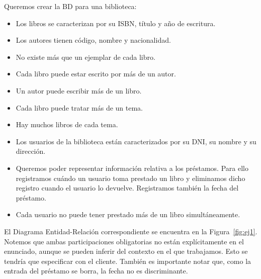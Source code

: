 \begin{ejercicio} \label{ej:1}
    Queremos crear la BD para una biblioteca:
    \begin{itemize}
        \item Los libros se caracterizan por su ISBN, título y año de escritura.
        \item Los autores tienen código, nombre y nacionalidad.
        \item No existe más que un ejemplar de cada libro.
        \item Cada libro puede estar escrito por más de un autor.
        \item Un autor puede escribir más de un libro.
        \item Cada libro puede tratar más de un tema.
        \item Hay muchos libros de cada tema.
        \item Los usuarios de la biblioteca están caracterizados por su DNI, su nombre y su dirección.
        \item Queremos poder representar información relativa a los préstamos. Para ello registramos cuándo un usuario toma prestado un libro y eliminamos dicho registro cuando el usuario lo devuelve. Registramos también la fecha del préstamo.
        \item Cada usuario no puede tener prestado más de un libro simultáneamente.
    \end{itemize}
    
    El Diagrama Entidad-Relación correspondiente se encuentra en la Figura~\ref{fig:ej1}.
    Notemos que ambas participaciones obligatorias no están explícitamente en el enunciado,
    aunque se pueden inferir del contexto en el que trabajamos. Esto se tendría que especificar con el cliente.
    También es importante notar que, como la entrada del préstamo se borra, la fecha no es discriminante. 
    \begin{figure}
        \centering
\end{figure}
\end{ejercicio}
